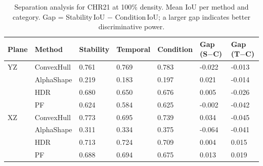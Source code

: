 \begin{table}[ht]
\centering
\small
\caption{Separation analysis for CHR21 at 100\% density. Mean IoU per method and category. Gap = Stability\,IoU $-$ Condition\,IoU; a larger gap indicates better discriminative power.}
\label{tab:separation_chr21}
\begin{tabular}{lllllll}
\toprule
Plane & Method & Stability & Temporal & Condition & Gap (S$-$C) & Gap (T$-$C) \\
\midrule
YZ & ConvexHull & 0.761 & 0.769 & 0.783 & -0.022 & -0.013 \\
 & AlphaShape & 0.219 & 0.183 & 0.197 & 0.021 & -0.014 \\
 & HDR & 0.680 & 0.650 & 0.676 & 0.005 & -0.026 \\
 & PF & 0.624 & 0.584 & 0.625 & -0.002 & -0.042 \\
XZ & ConvexHull & 0.773 & 0.695 & 0.739 & 0.034 & -0.045 \\
 & AlphaShape & 0.311 & 0.334 & 0.375 & -0.064 & -0.041 \\
 & HDR & 0.713 & 0.724 & 0.709 & 0.004 & 0.015 \\
 & PF & 0.688 & 0.694 & 0.675 & 0.013 & 0.019 \\
\bottomrule
\end{tabular}
\end{table}